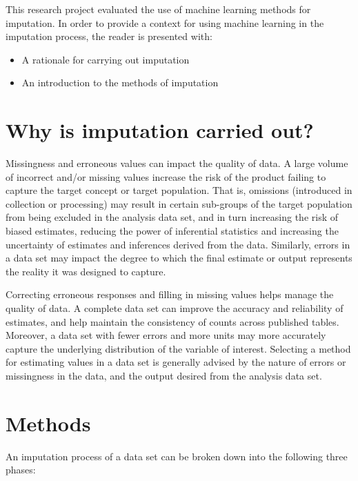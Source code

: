 \documentclass[]{book}
\providecommand{\tightlist}{%
  \setlength{\itemsep}{0pt}\setlength{\parskip}{0pt}}
\begin{document}
This research project evaluated the use of machine learning methods for
imputation. In order to provide a context for using machine learning in
the imputation process, the reader is presented with:

\begin{itemize}
\tightlist
\item
  A rationale for carrying out imputation\\
\item
  An introduction to the methods of imputation
\end{itemize}

\section{Why is imputation carried
out?}\label{why-is-imputation-carried-out}

Missingness and erroneous values can impact the quality of data. A large
volume of incorrect and/or missing values increase the risk of the
product failing to capture the target concept or target population. That
is, omissions (introduced in collection or processing) may result in
certain sub-groups of the target population from being excluded in the
analysis data set, and in turn increasing the risk of biased estimates,
reducing the power of inferential statistics and increasing the
uncertainty of estimates and inferences derived from the data.
Similarly, errors in a data set may impact the degree to which the final
estimate or output represents the reality it was designed to capture.

Correcting erroneous responses and filling in missing values helps
manage the quality of data. A complete data set can improve the accuracy
and reliability of estimates, and help maintain the consistency of
counts across published tables. Moreover, a data set with fewer errors
and more units may more accurately capture the underlying distribution
of the variable of interest. Selecting a method for estimating values in
a data set is generally advised by the nature of errors or missingness
in the data, and the output desired from the analysis data set.

\section{Methods}\label{methods}

An imputation process of a data set can be broken down into the
following three phases:
\end{document}
